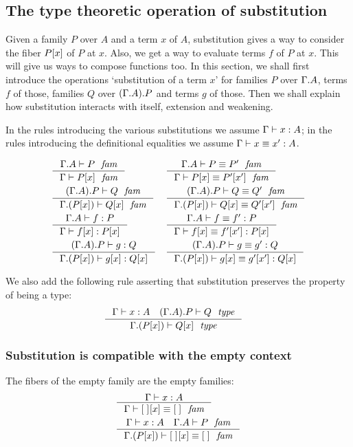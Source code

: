 \subsection{The type theoretic operation of substitution}
Given a family $P$ over $A$ and a term $x$ of $A$, substitution gives a way to
consider the fiber $\subst{x}{P}$ of $P$ at $x$. Also, we get a way to evaluate
terms $f$ of $P$ at $x$. This will give us ways to compose functions too. In
this section, we shall first introduce the operations `substitution of a term $x$'
for families $P$ over $\ctxext{\Gamma}{A}$, terms $f$ of those, families $Q$ over
$\ctxext{{\Gamma}{A}}{P}$ and terms $g$ of those. 
Then we shall explain how substitution interacts
with itself, extension and weakening.

In the rules introducing the various substitutions we assume $\jterm{\Gamma}{A}{x}$;
in the rules introducing the definitional equalities we assume $\jtermeq{\Gamma}{A}{x}{x'}$.

\begin{align}
& \inference{\jfam{\ctxext{\Gamma}{A}}{P}}{\jfam{\Gamma}{\subst{x}{P}}}
& & \inference{\jfameq{\ctxext{\Gamma}{A}}{P}{P'}}{\jfameq{\Gamma}{\subst{x}{P}}{\subst{x'}{P'}}}\\
& \inference{\jfam{\ctxext{{\Gamma}{A}}{P}}{Q}}{\jfam{\ctxext{\Gamma}{\subst{x}{P}}}{\subst{x}{Q}}}
& & \inference{\jfameq{\ctxext{{\Gamma}{A}}{P}}{Q}{Q'}}{\jfameq{\ctxext{\Gamma}{\subst{x}{P}}}{\subst{x}{Q}}{\subst{x'}{Q'}}}\\
& \inference{\jterm{\ctxext{\Gamma}{A}}{P}{f}}{\jterm{\Gamma}{\subst{x}{P}}{\subst{x}{f}}}
& & \inference{\jtermeq{\ctxext{\Gamma}{A}}{P}{f}{f'}}{\jtermeq{\Gamma}{\subst{x}{P}}{\subst{x}{f}}{\subst{x'}{f'}}}\\
& \inference{\jterm{\ctxext{{\Gamma}{A}}{P}}{Q}{g}}{\jterm{\ctxext{\Gamma}{\subst{x}{P}}}{\subst{x}{Q}}{\subst{x}{g}}}
& &\inference{\jtermeq{\ctxext{{\Gamma}{A}}{P}}{Q}{g}{g'}}{\jtermeq{\ctxext{\Gamma}{\subst{x}{P}}}{\subst{x}{Q}}{\subst{x}{g}}{\subst{x'}{g'}}}
\end{align}

We also add the following rule asserting that substitution preserves the
property of being a type:
\begin{align}
& \inference{\jterm{\Gamma}{A}{x}\quad\jtype{\ctxext{{\Gamma}{A}}{P}}{Q}}{\jtype{\ctxext{\Gamma}{\subst{x}{P}}}{\subst{x}{Q}}}
\end{align}

\subsubsection{Substitution is compatible with the empty context}
The fibers of the empty family are the empty families:
\begin{align}
& \inference{\jterm{\Gamma}{A}{x}}{\jfameq{\Gamma}{\subst{x}{\emptyf}}{\emptyf}}\\
& \inference{\jterm{\Gamma}{A}{x}\quad\jfam{\ctxext{\Gamma}{A}}{P}}{\jfameq{\ctxext{\Gamma}{\subst{x}{P}}}{\subst{x}{\emptyf}}{\emptyf}}
\end{align}

